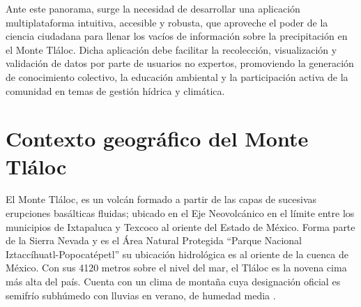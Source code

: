 Ante este panorama, surge la necesidad de desarrollar una aplicación multiplataforma intuitiva, accesible y robusta, que aproveche el poder de la ciencia ciudadana para llenar los vacíos de información sobre la precipitación en el Monte Tláloc. Dicha aplicación debe facilitar la recolección, visualización y validación de datos por parte de usuarios no expertos, promoviendo la generación de conocimiento colectivo, la educación ambiental y la participación activa de la comunidad en temas de gestión hídrica y climática.








\section{Contexto geográfico del Monte Tláloc}


El Monte Tláloc, es un volcán formado a partir de las capas de sucesivas erupciones basálticas fluidas; ubicado en el Eje Neovolcánico en el límite entre los municipios de Ixtapaluca y Texcoco al oriente del Estado de México. Forma parte de la Sierra Nevada y es el Área Natural Protegida “Parque Nacional Iztaccíhuatl-Popocatépetl” su ubicación hidrológica es al oriente de la cuenca de México. Con sus 4120 metros sobre el nivel del mar, el Tláloc es la novena cima más alta del país. Cuenta con un clima de montaña cuya designación oficial es semifrío subhúmedo con lluvias en verano, de humedad media \cite{inegi_texcoco}.


